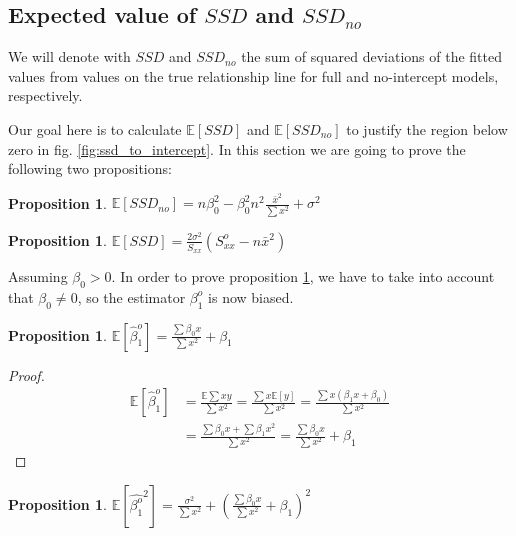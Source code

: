 \documentclass[12pt,a4paper,oneside]{book} %
\newtheorem{proposition}[theorem]{Proposition}
\newcommand{\E}{\mathbb{E}}
\begin{document}
\subsection{Expected value of $SSD$ and $SSD_{no}$}

We will denote with $SSD$ and $SSD_{no}$ the sum of squared deviations of the fitted values from values on the true relationship line for full and no-intercept models, respectively. 

Our goal here is to calculate $\E [SSD]$ and $\E [SSD_{no}]$ to justify the region below zero in fig. \ref{fig:ssd_to_intercept}. In this section we are going to prove the following two propositions:

\begin{proposition} \label{prop:ssd_no_intercept}
	$\E[SSD_{no}] = n \beta_0^2-\beta_0^2n^2 \frac{\bar{x}^2}{\sum x^2}+ \sigma^2$ 
\end{proposition}

\begin{proposition} \label{prop:ssd_full_model}
	$\E [SSD]= \frac{2\sigma^2}{S_{xx}}(S_{xx}^o-n\bar{x}^2)$
\end{proposition}

Assuming $\beta_0 >0$. In order to prove proposition \ref{prop:ssd_no_intercept}, we have to take into account that $\beta_0 \neq 0$, so the estimator $\beta_1^o$ is now biased.

\begin{proposition} \label{prop:expect_slope_term_biased}
	$	\E [\hat{\beta}_1^o]= \frac{\sum \beta_0 x }{\sum x^2} + \beta_1$ 
\end{proposition}

\begin{proof}

\begin{align*}
	\E [\hat{\beta}_1^o] &=\frac{\E \sum xy}{\sum x^2}
	= \frac{\sum x \E[y]}{\sum x^2} 
	=  \frac{\sum x (\beta_1 x + \beta_0) }{\sum x^2} \\
	&= \frac{\sum \beta_0 x + \sum \beta_1 x^2}{\sum x^2} 
= \frac{\sum \beta_0 x }{\sum x^2} + \beta_1
\end{align*}  

\end{proof}


\begin{proposition} \label{prop:expect_slope_term_biased_squared}
	$\E [\hat{\beta_1^o} ^2] = \frac{\sigma^2}{\sum x^2} + (\frac{\sum \beta_0 x}{\sum x^2}+ \beta_1)^2$ 
\end{proposition}
\end{document}
